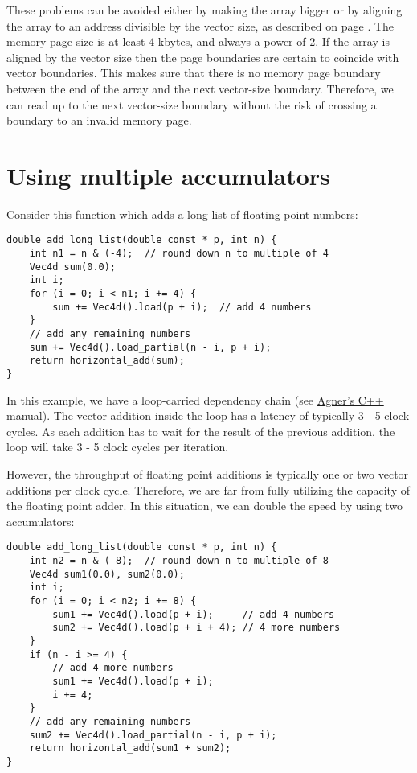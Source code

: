 \documentclass[vcl_manual.tex]{subfiles}
\begin{document}
These problems can be avoided either by making the array bigger or by aligning the array to an address divisible by the vector size, as described on page \pageref{Alignment}. The memory page size is at least 4 kbytes, and always a power of 2. If the array is aligned by the vector size then the page boundaries are certain to coincide with vector boundaries. This makes sure that there is no memory page boundary between the end of the array and the next vector-size boundary. Therefore, we can read up to the next vector-size boundary without the risk of crossing a boundary to an invalid memory page.


\section{Using multiple accumulators} \label{UsingMultipleAccumulators}

Consider this function which adds a long list of floating point numbers:

\begin{example}
\label{exampleLoopAccumulator1}
\end{example}
\begin{lstlisting}[frame=single]
double add_long_list(double const * p, int n) {
    int n1 = n & (-4);  // round down n to multiple of 4
    Vec4d sum(0.0);
    int i;
    for (i = 0; i < n1; i += 4) {
        sum += Vec4d().load(p + i);  // add 4 numbers
    }
    // add any remaining numbers
    sum += Vec4d().load_partial(n - i, p + i);
    return horizontal_add(sum);
}
\end{lstlisting}

In this example, we have a loop-carried dependency chain (see
\href{https://www.agner.org/optimize/#manual_cpp}{Agner's C++ manual}). 
The vector addition inside the loop has a latency of typically 3 - 5 clock cycles. As each addition has to wait for the result of the previous addition, the loop will take 3 - 5 clock cycles per iteration.

However, the throughput of floating point additions is typically one or two vector additions per clock cycle. Therefore, we are far from fully utilizing the capacity of the floating point adder. In this situation, we can double the speed by using two accumulators:

\begin{example}
\label{exampleLoopAccumulator2}
\end{example}
\begin{lstlisting}[frame=single]
double add_long_list(double const * p, int n) {
    int n2 = n & (-8);  // round down n to multiple of 8
    Vec4d sum1(0.0), sum2(0.0);
    int i;
    for (i = 0; i < n2; i += 8) {
        sum1 += Vec4d().load(p + i);     // add 4 numbers
        sum2 += Vec4d().load(p + i + 4); // 4 more numbers
    }
    if (n - i >= 4) {
        // add 4 more numbers
        sum1 += Vec4d().load(p + i);
        i += 4;
    }
    // add any remaining numbers
    sum2 += Vec4d().load_partial(n - i, p + i);
    return horizontal_add(sum1 + sum2);
}
\end{lstlisting}
\end{document}

